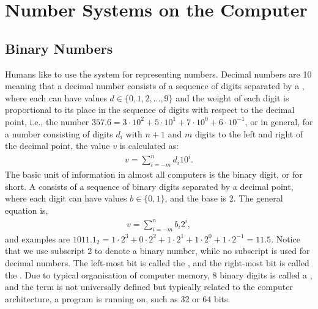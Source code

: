 \documentclass[fsharpNotes.tex]{subfiles}
\begin{document}
\chapter{Number Systems on the Computer}
\label{app:numbers}
\section{Binary Numbers}
\label{sec:binary}
Humans like to use the  system for representing numbers. Decimal numbers are  10 meaning that a decimal number consists of a sequence of digits separated by a , where each  can have values $d \in \{0,1,2,\ldots,9\}$ and the weight of each digit is proportional to its place in the sequence of digits with respect to the decimal point, i.e., the number $357.6=3\cdot 10^2+5\cdot 10^1+7\cdot 10^0+6\cdot 10^{-1}$, or in general, for a number consisting of digits $d_i$ with $n+1$ and $m$ digits to the left and right of the decimal point, the value $v$ is calculated as:
\begin{align}
  v = \sum_{i=-m}^nd_i10^i.
\end{align}
The basic unit of information in almost all computers is the binary digit, or  for short. A  consists of a sequence of binary digits separated by a decimal point, where each digit can have values $b \in \{0,1\}$, and the base is $2$. The general equation is,
\begin{align}
  v = \sum_{i=-m}^nb_i2^i,
\end{align}
and examples are $1011.1_2 = 1\cdot 2^3+0\cdot 2^2+1\cdot 2^1+1\cdot 2^0+1\cdot 2^{-1} = 11.5$. Notice that we use subscript 2 to denote a binary number, while no subscript is used for decimal numbers. The left-most bit is called the , and the right-most bit is called the . Due to typical organisation of computer memory, 8 binary digits is called a , and the term  is not universally defined but typically related to the computer architecture, a program is running on, such as 32 or 64 bits.
\end{document}
